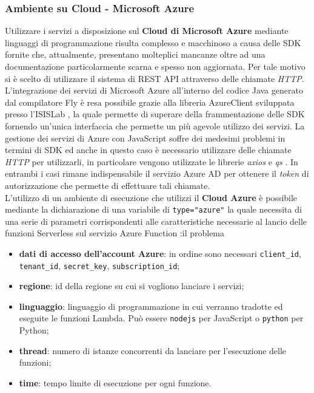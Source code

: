 \subsubsection{Ambiente su Cloud - Microsoft Azure}
Utilizzare i servizi a disposizione sul \textbf{Cloud di Microsoft Azure} mediante linguaggi di programmazione risulta complesso e macchinoso a causa delle SDK fornite che, attualmente, presentano molteplici mancanze oltre ad una documentazione particolarmente scarna e spesso non aggiornata. Per tale motivo si è scelto di utilizzare il sistema di REST API attraverso delle chiamate \textit{HTTP}. L'integrazione dei servizi di Microsoft Azure all'interno del codice Java generato dal compilatore Fly è resa possibile grazie alla libreria AzureClient sviluppata presso l'ISISLab \cite{Grieco}, la quale permette di superare  della frammentazione delle SDK fornendo un'unica interfaccia che permette un più agevole utilizzo dei servizi. La gestione dei servizi di Azure con JavaScript soffre dei medesimi problemi in termini di SDK ed anche in questo caso è necessario utilizzare delle chiamate \textit{HTTP} per utilizzarli, in particolare vengono utilizzate le librerie \textit{axios} \cite{axios} e \textit{qs} \cite{qs}. In entrambi i casi rimane indispensabile il servizio Azure AD \cite{azureAD} per ottenere il \textit{token} di autorizzazione che permette di effettuare tali chiamate.\\
L'utilizzo di un ambiente di esecuzione che utilizzi il \textbf{Cloud Azure} è possibile mediante la dichiarazione di una variabile di \verb|type|\verb|=|\verb|"azure"| la quale necessita di una serie di parametri corrispondenti alle caratteristiche necessarie al lancio delle funzioni Serverless sul servizio Azure Function \cite{azureFunction}:il problema

\begin{itemize}
    \item \textbf{dati di accesso dell'account Azure}: in ordine sono necessari \verb|client_id|,  \verb|tenant_id|, \verb|secret_key|, \verb|subscription_id|;
    \item \textbf{regione}: id della regione su cui si vogliono lanciare i servizi;
    \item \textbf{linguaggio}: linguaggio di programmazione in cui verranno tradotte ed eseguite le funzioni Lambda. Può essere \verb|nodejs| per JavaScript o \verb|python| per Python;
    \item \textbf{thread}: numero di istanze concorrenti da lanciare per l'esecuzione delle funzioni;
    \item \textbf{time}: tempo limite di esecuzione per ogni funzione.
\end{itemize}



